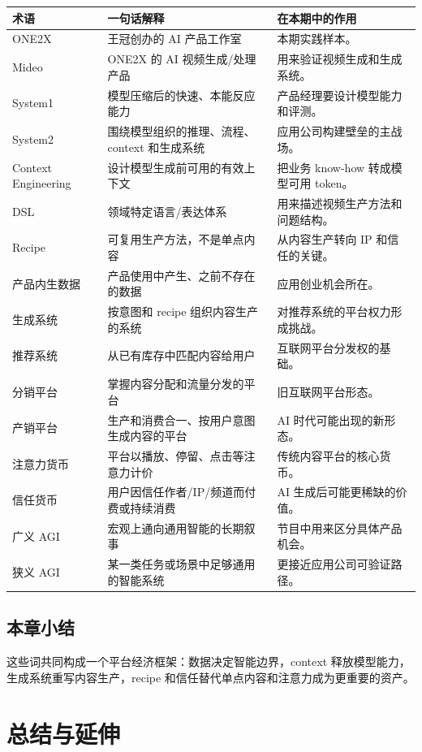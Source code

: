 \documentclass[a4paper]{article}
\begin{document}
\begin{longtable}{p{}p{}p{}}
\toprule
术语 & 一句话解释 & 在本期中的作用 \\
\midrule
ONE2X & 王冠创办的 AI 产品工作室 & 本期实践样本。 \\
Mideo & ONE2X 的 AI 视频生成/处理产品 & 用来验证视频生成和生成系统。 \\
System1 & 模型压缩后的快速、本能反应能力 & 产品经理要设计模型能力和评测。 \\
System2 & 围绕模型组织的推理、流程、context 和生成系统 & 应用公司构建壁垒的主战场。 \\
Context Engineering & 设计模型生成前可用的有效上下文 & 把业务 know-how 转成模型可用 token。 \\
DSL & 领域特定语言/表达体系 & 用来描述视频生产方法和问题结构。 \\
Recipe & 可复用生产方法，不是单点内容 & 从内容生产转向 IP 和信任的关键。 \\
产品内生数据 & 产品使用中产生、之前不存在的数据 & 应用创业机会所在。 \\
生成系统 & 按意图和 recipe 组织内容生产的系统 & 对推荐系统的平台权力形成挑战。 \\
推荐系统 & 从已有库存中匹配内容给用户 & 互联网平台分发权的基础。 \\
分销平台 & 掌握内容分配和流量分发的平台 & 旧互联网平台形态。 \\
产销平台 & 生产和消费合一、按用户意图生成内容的平台 & AI 时代可能出现的新形态。 \\
注意力货币 & 平台以播放、停留、点击等注意力计价 & 传统内容平台的核心货币。 \\
信任货币 & 用户因信任作者/IP/频道而付费或持续消费 & AI 生成后可能更稀缺的价值。 \\
广义 AGI & 宏观上通向通用智能的长期叙事 & 节目中用来区分具体产品机会。 \\
狭义 AGI & 某一类任务或场景中足够通用的智能系统 & 更接近应用公司可验证路径。 \\
\bottomrule
\end{longtable}

\subsection{本章小结}

这些词共同构成一个平台经济框架：数据决定智能边界，context 释放模型能力，生成系统重写内容生产，recipe 和信任替代单点内容和注意力成为更重要的资产。

\section{总结与延伸}
\end{document}
